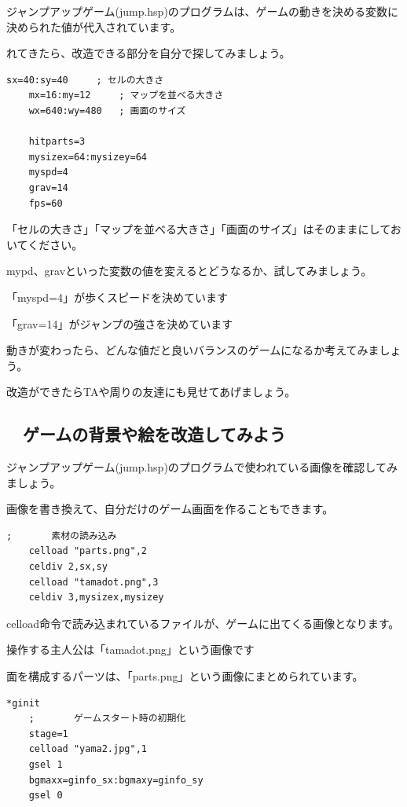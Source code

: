 ジャンプアップゲーム(jump.hsp)のプログラムは、ゲームの動きを決める変数に決められた値が代入されています。

れてきたら、改造できる部分を自分で探してみましょう。



\begin{lstlisting}[firstnumber=3,caption=jump.hspのプログラムの一部]
	sx=40:sy=40     ; セルの大きさ
	mx=16:my=12     ; マップを並べる大きさ
	wx=640:wy=480   ; 画面のサイズ

	hitparts=3
	mysizex=64:mysizey=64
	myspd=4
	grav=14
	fps=60
\end{lstlisting}


「セルの大きさ」「マップを並べる大きさ」「画面のサイズ」はそのままにしておいてください。

mypd、gravといった変数の値を変えるとどうなるか、試してみましょう。

\exampleanswer

「myspd=4」が歩くスピードを決めています

「grav=14」がジャンプの強さを決めています

動きが変わったら、どんな値だと良いバランスのゲームになるか考えてみましょう。

改造ができたらTAや周りの友達にも見せてあげましょう。


\newpage
\subsection{\useOmetoiExample　ゲームの背景や絵を改造してみよう}


\exampleinduction

ジャンプアップゲーム(jump.hsp)のプログラムで使われている画像を確認してみましょう。

画像を書き換えて、自分だけのゲーム画面を作ることもできます。

\begin{lstlisting}[firstnumber=15,caption=jump.hspのプログラムの一部]
	;       素材の読み込み
	celload "parts.png",2
	celdiv 2,sx,sy
	celload "tamadot.png",3
	celdiv 3,mysizex,mysizey
\end{lstlisting}

celload命令で読み込まれているファイルが、ゲームに出てくる画像となります。

操作する主人公は「tamadot.png」という画像です

面を構成するパーツは、「parts.png」という画像にまとめられています。

\begin{lstlisting}[firstnumber=50,caption=jump.hspのプログラムの一部]
*ginit
    ;       ゲームスタート時の初期化
    stage=1
    celload "yama2.jpg",1
    gsel 1
    bgmaxx=ginfo_sx:bgmaxy=ginfo_sy
    gsel 0
\end{lstlisting}

